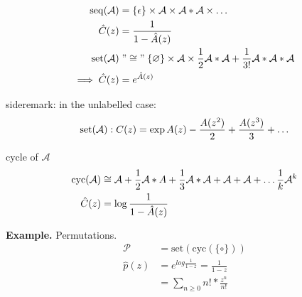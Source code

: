 \begin{align*}
    \operatorname{seq}(\mathcal{A}) &= \{\epsilon\} \times \mathcal{A} \times \mathcal{A}*\mathcal{A} \times \ldots \\
    \hat{C}(z) &= \frac{1}{1-\hat{A}(z)} \\
    \operatorname{set}(\mathcal{A}) &\mathrel{"\cong"} \{\varnothing\} 
        \times \mathcal{A} 
        \times \frac{1}{2}\mathcal{A} * \mathcal{A} + \frac{1}{3!}\mathcal{A}*\mathcal{A}*\mathcal{A} \\
        \implies \hat{C}(z) &= e^{\hat{A}(z)}
\end{align*}

sideremark: in the unlabelled case: 
\begin{align*}
    \operatorname{set}(\mathcal{A}): C(z) = \exp{A(z) - \frac{A(z^2)}{2} + \frac{A(z^3)}{3} + \ldots }
\end{align*}

cycle of $\mathcal{A}$
\begin{align*}
    \operatorname{cyc}(\mathcal{A}) &\cong \mathcal{A} + \frac{1}{2}\mathcal{A} * A + \frac{1}{3}\mathcal{A}*\mathcal{A} + \mathcal{A} + \mathcal{A} + \ldots \frac{1}{k}\mathcal{A}^k \\
    \hat{C}(z) &= \log\frac{1}{1-\hat{A}(z)}
\end{align*}

\textbf{Example.}
Permutations. 
\begin{align*}
    \mathcal{P} &= \text{set}(\text{cyc}(\{ \circ \} )) \\
    \hat{p}(z) &= e^{log \frac{1}{1-z}} = \frac{1}{1-z} \\
        &= \sum_{n\geq 0} n! * \frac{z^n}{n!}
\end{align*}



